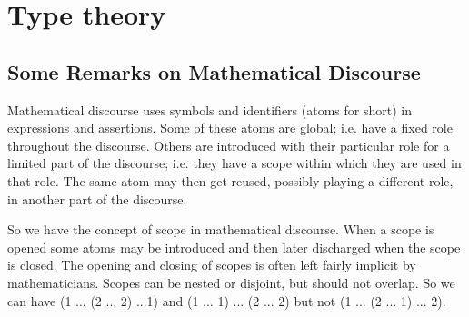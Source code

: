 \chapter{Type theory}
\label{cha:typetheory}


{%


\newcommand{\stype}{{\;\sf type}}
\newcommand{\rec}{{\sf rec}}
\newcommand{\bool}{{\bf B}}
\newcommand{\app}{{\sf app}}
\newcommand{\pair}{{\sf pair}}
\newcommand{\inleft}{{\sf inleft}}
\newcommand{\inright}{{\sf inright}}
\newcommand{\emptyt}{{\bf 0}}
\newcommand{\unitt}{{\bf 1}}
\section*{Some Remarks on Mathematical Discourse}

Mathematical discourse uses symbols and identifiers (atoms for short) in expressions and assertions.  Some of these atoms are global; i.e. have a fixed role throughout the discourse.  Others are introduced with their particular role for a limited part of the discourse; i.e. they have a scope within which they are used in that role.  The same atom may then get reused, possibly playing a different role, in another part of the discourse.  

So we have the concept of scope in mathematical discourse.  When a scope is opened some atoms may be introduced and then later discharged when the scope is closed.  The opening and closing of scopes is often left fairly implicit by mathematicians.  Scopes can be nested or disjoint, but should not overlap.  So we can have (1 ... (2 ... 2) ...1) and (1 ... 1) ... (2 ... 2) but not 
(1 ... (2 ... 1) ... 2).  

}
